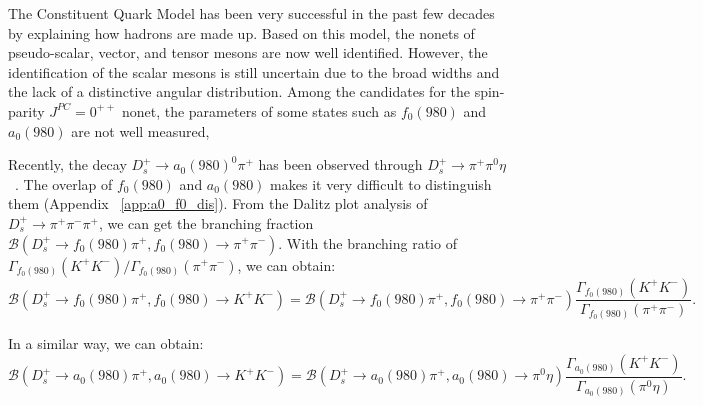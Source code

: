 \par{
    The Constituent Quark Model has been very successful in the past few decades by explaining how hadrons are made up.
    Based on this model, the nonets of pseudo-scalar, vector, and tensor mesons are now well identified.
    However, the identification of the scalar mesons is still uncertain due to the broad widths and the lack of a distinctive angular distribution.
    Among the candidates for the spin-parity $J^{PC}=0^{++}$ nonet, the parameters of some states such as $f_{0}(980)$ and $a_{0}(980)$ are not well measured,
    
    
    
    Recently, the decay $D_{s}^{+} \rightarrow a_{0}(980)^{0}\pi^{+}$ has been observed through $D_{s}^{+} \rightarrow \pi^{+}\pi^{0}\eta$~\cite{Doc-DB-682-v7}.
    The overlap of $f_{0}(980)$ and $a_{0}(980)$ makes it very difficult to distinguish them (Appendix ~\ref{app:a0_f0_dis}).
    From the Dalitz plot analysis of $D_{s}^{+} \rightarrow \pi^{+}\pi^{-}\pi^{+}$, we can get the branching fraction $\mathcal{B}(D_{s}^{+} \rightarrow f_{0}(980)\pi^{+}, f_{0}(980) \rightarrow \pi^{+}\pi^{-})$.
    With the branching ratio of $\Gamma_{f_{0}(980)}(K^{+}K^{-})/\Gamma_{f_{0}(980)}(\pi^{+}\pi^{-})$, we can obtain:
    \begin{equation}
            \mathcal{B}(D_{s}^{+} \rightarrow f_{0}(980)\pi^{+}, f_{0}(980) \rightarrow K^{+}K^{-}) =\mathcal{B}(D_{s}^{+} \rightarrow f_{0}(980)\pi^{+}, f_{0}(980) \rightarrow \pi^{+}\pi^{-})  \frac{\Gamma_{f_{0}(980)}(K^{+}K^{-})}{ \Gamma_{f_{0}(980)}(\pi^{+}\pi^{-})}. \label{bf-f0}
    \end{equation}
    
    In a similar way, we can obtain:
    \begin{equation}
            \mathcal{B}(D_{s}^{+} \rightarrow a_{0}(980)\pi^{+}, a_{0}(980) \rightarrow K^{+}K^{-}) =\mathcal{B}(D_{s}^{+} \rightarrow a_{0}(980)\pi^{+}, a_{0}(980) \rightarrow \pi^{0}\eta)  \frac{\Gamma_{a_{0}(980)}(K^{+}K^{-})}{ \Gamma_{a_{0}(980)}(\pi^{0}\eta)}. \label{bf-a0} 
    \end{equation}
    
}
